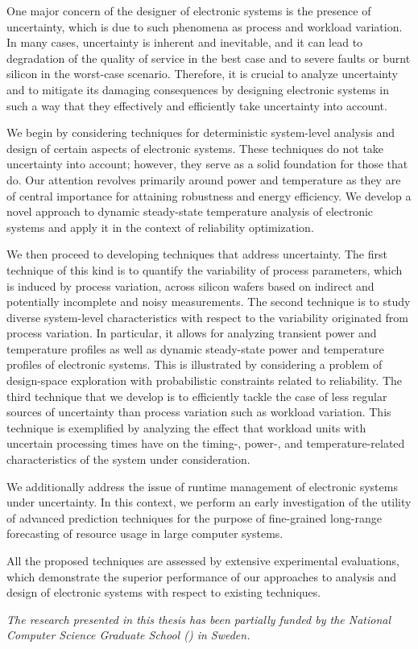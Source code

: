 One major concern of the designer of electronic systems is the presence of
uncertainty, which is due to such phenomena as process and workload variation.
In many cases, uncertainty is inherent and inevitable, and it can lead to
degradation of the quality of service in the best case and to severe faults or
burnt silicon in the worst-case scenario. Therefore, it is crucial to analyze
uncertainty and to mitigate its damaging consequences by designing electronic
systems in such a way that they effectively and efficiently take uncertainty
into account.

We begin by considering techniques for deterministic system-level analysis and
design of certain aspects of electronic systems. These techniques do not take
uncertainty into account; however, they serve as a solid foundation for those
that do. Our attention revolves primarily around power and temperature as they
are of central importance for attaining robustness and energy efficiency. We
develop a novel approach to dynamic steady-state temperature analysis of
electronic systems and apply it in the context of reliability optimization.

We then proceed to developing techniques that address uncertainty. The first
technique of this kind is to quantify the variability of process parameters,
which is induced by process variation, across silicon wafers based on indirect
and potentially incomplete and noisy measurements. The second technique is to
study diverse system-level characteristics with respect to the variability
originated from process variation. In particular, it allows for analyzing
transient power and temperature profiles as well as dynamic steady-state power
and temperature profiles of electronic systems. This is illustrated by
considering a problem of design-space exploration with probabilistic constraints
related to reliability. The third technique that we develop is to efficiently
tackle the case of less regular sources of uncertainty than process variation
such as workload variation. This technique is exemplified by analyzing the
effect that workload units with uncertain processing times have on the timing-,
power-, and temperature-related characteristics of the system under
consideration.

We additionally address the issue of runtime management of electronic systems
under uncertainty. In this context, we perform an early investigation of the
utility of advanced prediction techniques for the purpose of fine-grained
long-range forecasting of resource usage in large computer systems.

All the proposed techniques are assessed by extensive experimental evaluations,
which demonstrate the superior performance of our approaches to analysis and
design of electronic systems with respect to existing techniques.

\vspace{1em}
\noindent
\emph{
  The research presented in this thesis has been partially funded by the
  National Computer Science Graduate School () in Sweden.
}
